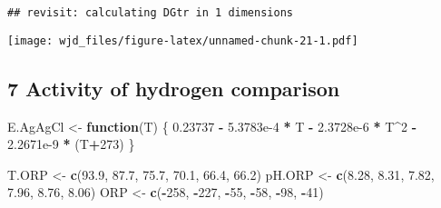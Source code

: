 \documentclass[]{article}
\newenvironment{Shaded}{\begin{snugshade}}{\end{snugshade}}
\newcommand{\KeywordTok}[1]{\textcolor[rgb]{0.13,0.29,0.53}{\textbf{#1}}}
\newcommand{\DataTypeTok}[1]{\textcolor[rgb]{0.13,0.29,0.53}{#1}}
\newcommand{\DecValTok}[1]{\textcolor[rgb]{0.00,0.00,0.81}{#1}}
\newcommand{\FloatTok}[1]{\textcolor[rgb]{0.00,0.00,0.81}{#1}}
\newcommand{\StringTok}[1]{\textcolor[rgb]{0.31,0.60,0.02}{#1}}
\newcommand{\ControlFlowTok}[1]{\textcolor[rgb]{0.13,0.29,0.53}{\textbf{#1}}}
\newcommand{\OperatorTok}[1]{\textcolor[rgb]{0.81,0.36,0.00}{\textbf{#1}}}
\newcommand{\NormalTok}[1]{#1}
\begin{document}
\begin{verbatim}
## revisit: calculating DGtr in 1 dimensions
\end{verbatim}

\texttt{[image: wjd\_files/figure-latex/unnamed-chunk-21-1.pdf]}

\subsection{7 Activity of hydrogen
comparison}\label{activity-of-hydrogen-comparison}

\begin{Shaded}
\begin{Highlighting}[]
\NormalTok{E.AgAgCl <-}\StringTok{ }\ControlFlowTok{function}\NormalTok{(T) \{}
\FloatTok{0.23737} \OperatorTok{-}\StringTok{ }\FloatTok{5.3783e-4} \OperatorTok{*}\StringTok{ }\NormalTok{T }\OperatorTok{-}\StringTok{ }\FloatTok{2.3728e-6} \OperatorTok{*}\StringTok{ }\NormalTok{T}\OperatorTok{^}\DecValTok{2} \OperatorTok{-}\StringTok{ }\FloatTok{2.2671e-9} \OperatorTok{*}\StringTok{ }\NormalTok{(T}\OperatorTok{+}\DecValTok{273}\NormalTok{)}
\NormalTok{\}}
\end{Highlighting}
\end{Shaded}

\begin{Shaded}
\begin{Highlighting}[]
\NormalTok{T.ORP <-}\StringTok{ }\KeywordTok{c}\NormalTok{(}\FloatTok{93.9}\NormalTok{, }\FloatTok{87.7}\NormalTok{, }\FloatTok{75.7}\NormalTok{, }\FloatTok{70.1}\NormalTok{, }\FloatTok{66.4}\NormalTok{, }\FloatTok{66.2}\NormalTok{)}
\NormalTok{pH.ORP <-}\StringTok{ }\KeywordTok{c}\NormalTok{(}\FloatTok{8.28}\NormalTok{, }\FloatTok{8.31}\NormalTok{, }\FloatTok{7.82}\NormalTok{, }\FloatTok{7.96}\NormalTok{, }\FloatTok{8.76}\NormalTok{, }\FloatTok{8.06}\NormalTok{)}
\NormalTok{ORP <-}\StringTok{ }\KeywordTok{c}\NormalTok{(}\OperatorTok{-}\DecValTok{258}\NormalTok{, }\OperatorTok{-}\DecValTok{227}\NormalTok{, }\OperatorTok{-}\DecValTok{55}\NormalTok{, }\OperatorTok{-}\DecValTok{58}\NormalTok{, }\OperatorTok{-}\DecValTok{98}\NormalTok{, }\OperatorTok{-}\DecValTok{41}\NormalTok{)}
\end{Highlighting}
\end{Shaded}

\begin{Shaded}
\end{Shaded}
\end{document}
